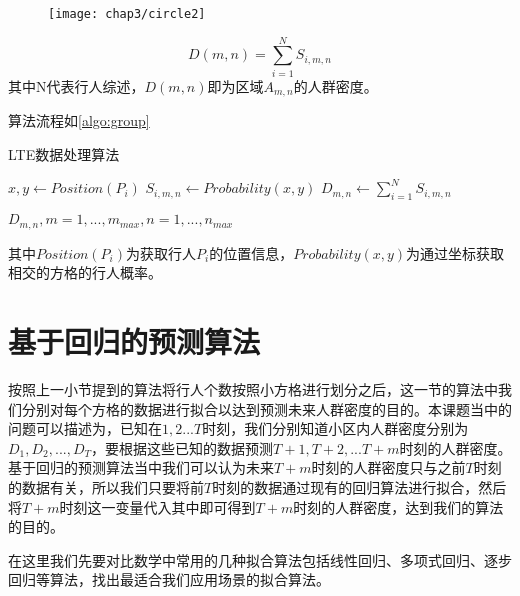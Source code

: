 \begin{figure}[!htp]
    \centering
    \texttt{[image: chap3/circle2]}
\end{figure}

\begin{equation}
    \label{eq:pd}
    D(m,n)=\sum_{i=1}^{N}S_{i,m,n}
\end{equation}
其中N代表行人综述，${D(m,n)}$即为区域$A_{m,n}$的人群密度。

算法流程如\ref{algo:group}

\begin{algorithm}
    \caption{LTE数据处理算法}
    \label{algo:group}
    \begin{algorithmic}[1]
        \State $x,y \gets Position(P_{i})$
        \State $S_{i,m,n} \gets Probability(x, y)$
    \EndFor
        \State $D_{m,n} \gets \sum_{i=1}^{N}S_{i,m,n}$
    \EndFor
    \end{algorithmic}
    \State
    \Return $D_{m,n}, m=1,...,m_{max}, n=1,...,n_{max}$
\end{algorithm}
其中$Position(P_{i})$为获取行人$P_{i}$的位置信息，$Probability(x,y)$为通过坐标获取相交的方格的行人概率。

\section{基于回归的预测算法}

按照上一小节提到的算法将行人个数按照小方格进行划分之后，这一节的算法中我们分别对每个方格的数据进行拟合以达到预测未来人群密度的目的。本课题当中的问题可以描述为，已知在$1,2...T$时刻，我们分别知道小区内人群密度分别为$D_{1},D_{2},...,D_{T}$，要根据这些已知的数据预测$T+1,T+2,...T+m$时刻的人群密度。基于回归的预测算法当中我们可以认为未来$T+m$时刻的人群密度只与之前$T$时刻的数据有关，所以我们只要将前$T$时刻的数据通过现有的回归算法进行拟合，然后将$T+m$时刻这一变量代入其中即可得到$T+m$时刻的人群密度，达到我们的算法的目的。

在这里我们先要对比数学中常用的几种拟合算法包括线性回归、多项式回归、逐步回归等算法，找出最适合我们应用场景的拟合算法。

